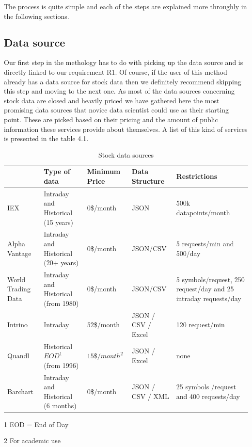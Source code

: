 The process is quite simple and each of the steps are explained more throughly in the following sections.

\subsection{Data source}

Our first step in the methology has to do with picking up the data source and is directly linked to our requirement R1.
Of course, if the user of this method already has a data source for stock data then we definitely recommend skipping this step and moving to the next one. 
As most of the data sources concerning stock data are closed and heavily priced we have gathered here the most promising data sources that novice data scientist could use as their starting point.
These are picked based on their pricing and the amount of public information these services provide about themselves.
A list of this kind of services is presented in the table 4.1.

\begin{table}[! htbp]\centering 
    \caption{Stock data sources}
    \begin{threeparttable}
        \begin{tabular}{|p{2cm}|p{2.5cm}|l|p{2cm}|p{3cm}|} 
        \hline
        & Type of data & Minimum Price & Data Structure & Restrictions \\ \hline
        IEX \cite{iex}& Intraday and Historical (15 years) & 0\$/month & JSON & 500k datapoints/month \\ \hline
        Alpha Vantage \cite{alphavantage}  & Intraday and Historical (20+ years)& 0\$/month & JSON/CSV & 5 requests/min and 500/day\\ \hline
        World Trading Data \cite{worldtradingdata} & Intraday and Historical (from 1980) & 0\$/month & JSON/CSV & 5 symbols/request, 250 request/day and 25 intraday requests/day\\ \hline
        Intrino \cite{intrino} & Intraday & 52\$/month & JSON / CSV / Excel & 120 request/min\\ \hline
        Quandl \cite{quandl} & Historical $EOD^1$ (from 1996) & $15\$/month^2$ & JSON / Excel & none\\ \hline
        Barchart \cite{barchart} & Intraday and Historical (6 months) & 0\$/month & JSON / CSV / XML & 25 symbols /request and 400 requests/day\\
        \hline
        \end{tabular}
        \begin{tablenotes}\footnotesize
            \item[1] EOD = End of Day
            \item[2] For academic use 
        \end{tablenotes}
    \end{threeparttable}        
\end{table}

